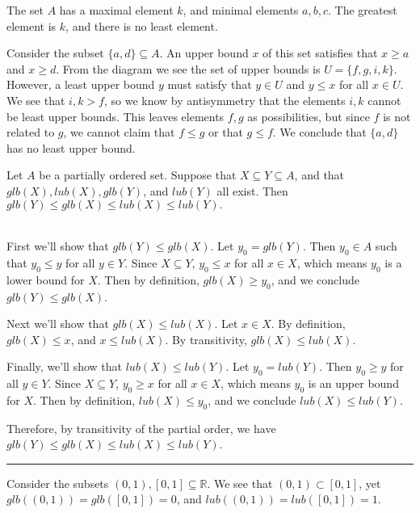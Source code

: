 \documentclass[11pt]{hmcpset}
\newenvironment{problem2}[1]{\noindent {\bf (#1}}
{\medskip}
\newenvironment{problem1}[1]{\noindent {\bf Problem #1}}
{\medskip}
\newenvironment{proof}{\noindent {\bf Proof:} \\}{\hfill
\rule{1mm}{3mm} \bigskip}
\begin{document}
\begin{problem1}{3. (a)} The set $A$ has a maximal element $k$, and minimal elements $a,b,c$. The greatest element is $k$, and there is no least element.
\end{problem1}

\begin{problem2}{b)} Consider the subset $\{a,d\}\subseteq A$. An upper bound $x$ of this set satisfies that $x\ge a$ and $x\ge d$. From the diagram we see the set of upper bounds is $U=\{f,g,i,k\}$. However, a least upper bound $y$ must satisfy that $y\in U$ and $y\le x$ for all $x\in U$. We see that $i,k >f$, so we know by antisymmetry that the elements $i,k$ cannot be least upper bounds. This leaves elements $f,g$ as possibilities, but since $f$ is not related to $g$, we cannot claim that $f\le g$ or that $g\le f$. We conclude that $\{a,d\}$ has no least upper bound.
\end{problem2}

\begin{problem1}{4. (a)} Let $A$ be a partially ordered set. Suppose that $X\subseteq Y\subseteq A$, and that $glb(X),lub(X),glb(Y)$, and $lub(Y)$ all exist. Then $glb(Y)\le glb(X)\le lub(X) \le lub(Y).$

\begin{proof}\indent First we'll show that $glb(Y)\le glb(X)$. Let $y_0=glb(Y)$. Then $y_0\in A$ such that $y_0\le y$ for all $y\in Y$. Since $X\subseteq Y$, $y_0\le x$ for all $x\in X$, which means $y_0$ is a lower bound for $X$. Then by definition, $glb(X)\ge y_0$, and we conclude $glb(Y)\le glb(X)$.

Next we'll show that $glb(X)\le lub(X)$. Let $x\in X$. By definition, $glb(X)\le x$, and $x\le lub(X)$. By transitivity, $glb(X)\le lub(X)$.

Finally, we'll show that $lub(X)\le lub(Y)$. Let $y_0=lub(Y).$ Then $y_0\ge y$ for all $y\in Y$. Since $X\subseteq Y$, $y_0\ge x$ for all $x\in X$, which means $y_0$ is an upper bound for $X$. Then by definition, $lub(X)\le y_0$, and we conclude $lub(X)\le lub(Y)$.

Therefore, by transitivity of the partial order, we have $glb(Y)\le glb(X) \le lub(X)\le lub(Y)$.\end{proof}
\end{problem1}

\begin{problem2}{b)} Consider the subsets $(0,1),[0,1]\subseteq\mathbb{R}$. We see that $(0,1)\subset[0,1]$, yet $glb((0,1))=glb([0,1])=0$, and $lub((0,1))=lub([0,1])=1$.
\end{problem2}
\end{document}
